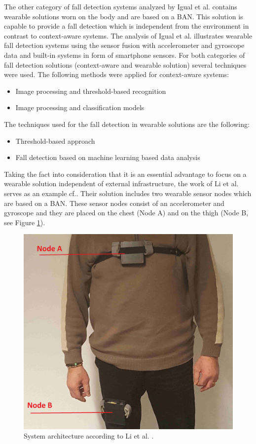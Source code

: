 \documentclass[10pt,journal,compsoc]{IEEEtran}
\begin{document}
The other category of fall detection systems analyzed by Igual et al. \cite{Igual2013} contains wearable solutions worn on the body and are based on a BAN. This solution is capable to provide a fall detection which is independent from the environment in contrast to context-aware systems. The analysis of Igual et al. \cite{Igual2013} illustrates wearable fall detection systems using the sensor fusion with accelerometer and gyroscope data and built-in systems in form of smartphone sensors. For both categories of fall detection solutions (context-aware and wearable solution) several techniques were used. The following methods were applied for context-aware systems:
\begin{itemize}
	\item Image processing and threshold-based recognition
	\item Image processing and classification models
\end{itemize} 
The techniques used for the fall detection in wearable solutions are the following:
\begin{itemize}
	\item Threshold-based approach
	\item Fall detection based on machine learning based data analysis
\end{itemize}
Taking the fact into consideration that it is an essential advantage to focus on a wearable solution independent of external infrastructure, the work of Li et al.\cite{Li2009} serves as an example cf.\cite{LorenaFall}. Their solution includes two wearable sensor nodes which are based on a BAN. These sensor nodes consist of an accelerometer and gyroscope and they are placed on the chest (Node A) and on the thigh (Node B, see Figure \ref{fig:LietAl-Architecture}). 
\begin{figure}[!ht] 
	\centering
	\includegraphics[scale=0.14]{Images/BasePrototype.png}
	\caption[System architecture according to Li et al.]{System architecture according to Li et al. \cite{Li2009}.}
	\label{fig:LietAl-Architecture}
\end{figure}
\end{document}
